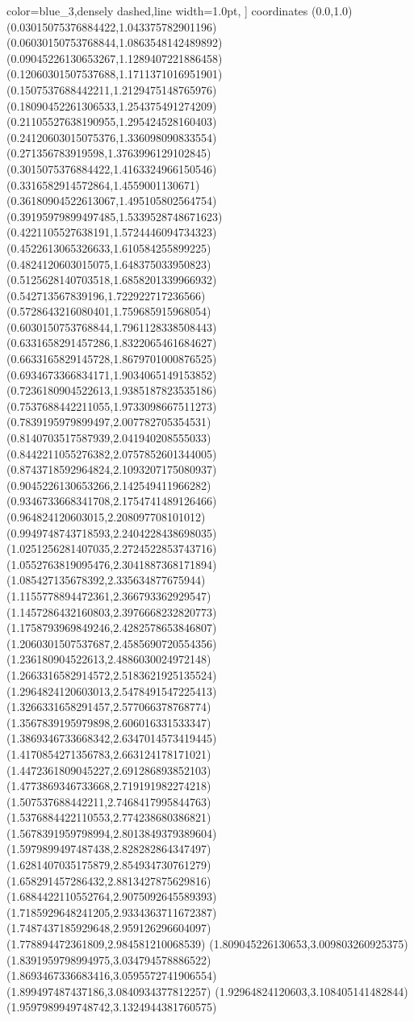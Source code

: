 color=blue_3,densely dashed,line width=1.0pt,
]
coordinates {%
(0.0,1.0)
(0.03015075376884422,1.043375782901196)
(0.06030150753768844,1.0863548142489892)
(0.09045226130653267,1.1289407221886458)
(0.12060301507537688,1.1711371016951901)
(0.1507537688442211,1.2129475148765976)
(0.18090452261306533,1.254375491274209)
(0.21105527638190955,1.295424528160403)
(0.24120603015075376,1.336098090833554)
(0.271356783919598,1.3763996129102845)
(0.3015075376884422,1.4163324966150546)
(0.3316582914572864,1.4559001130671)
(0.36180904522613067,1.495105802564754)
(0.39195979899497485,1.5339528748671623)
(0.4221105527638191,1.5724446094734323)
(0.4522613065326633,1.610584255899225)
(0.4824120603015075,1.648375033950823)
(0.5125628140703518,1.6858201339966932)
(0.542713567839196,1.722922717236566)
(0.5728643216080401,1.759685915968054)
(0.6030150753768844,1.7961128338508443)
(0.6331658291457286,1.8322065461684627)
(0.6633165829145728,1.8679701000876525)
(0.6934673366834171,1.9034065149153852)
(0.7236180904522613,1.9385187823535186)
(0.7537688442211055,1.9733098667511273)
(0.7839195979899497,2.007782705354531)
(0.8140703517587939,2.041940208555033)
(0.8442211055276382,2.0757852601344005)
(0.8743718592964824,2.1093207175080937)
(0.9045226130653266,2.142549411966282)
(0.9346733668341708,2.1754741489126466)
(0.964824120603015,2.208097708101012)
(0.9949748743718593,2.2404228438698035)
(1.0251256281407035,2.2724522853743716)
(1.0552763819095476,2.3041887368171894)
(1.085427135678392,2.335634877675944)
(1.1155778894472361,2.366793362929547)
(1.1457286432160803,2.3976668232820773)
(1.1758793969849246,2.4282578653846807)
(1.2060301507537687,2.4585690720554356)
(1.236180904522613,2.4886030024972148)
(1.2663316582914572,2.5183621925135524)
(1.2964824120603013,2.5478491547225413)
(1.3266331658291457,2.577066378768774)
(1.3567839195979898,2.606016331533347)
(1.3869346733668342,2.6347014573419445)
(1.4170854271356783,2.663124178171021)
(1.4472361809045227,2.691286893852103)
(1.4773869346733668,2.719191982274218)
(1.507537688442211,2.7468417995844763)
(1.5376884422110553,2.774238680386821)
(1.5678391959798994,2.8013849379389604)
(1.5979899497487438,2.828282864347497)
(1.6281407035175879,2.854934730761279)
(1.658291457286432,2.8813427875629816)
(1.6884422110552764,2.9075092645589393)
(1.7185929648241205,2.9334363711672387)
(1.7487437185929648,2.959126296604097)
(1.778894472361809,2.984581210068539)
(1.809045226130653,3.009803260925375)
(1.8391959798994975,3.034794578886522)
(1.8693467336683416,3.0595572741906554)
(1.899497487437186,3.0840934377812257)
(1.92964824120603,3.108405141482844)
(1.9597989949748742,3.1324944381760575)
}
